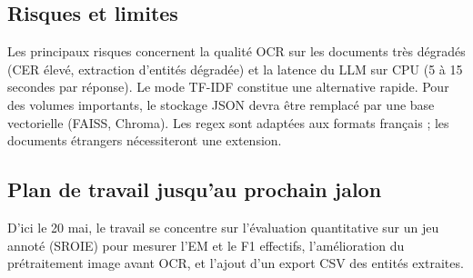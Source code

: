 \documentclass[11pt,a4paper]{article}
\begin{document}
\subsection{Risques et limites}

Les principaux risques concernent la qualité OCR sur les documents très dégradés (CER élevé, extraction d'entités dégradée) et la latence du LLM sur CPU (5 à 15 secondes par réponse). Le mode TF-IDF constitue une alternative rapide. Pour des volumes importants, le stockage JSON devra être remplacé par une base vectorielle (FAISS, Chroma). Les regex sont adaptées aux formats français ; les documents étrangers nécessiteront une extension.

\subsection{Plan de travail jusqu'au prochain jalon}

D'ici le 20 mai, le travail se concentre sur l'évaluation quantitative sur un jeu annoté (SROIE) pour mesurer l'EM et le F1 effectifs, l'amélioration du prétraitement image avant OCR, et l'ajout d'un export CSV des entités extraites.
\end{document}

